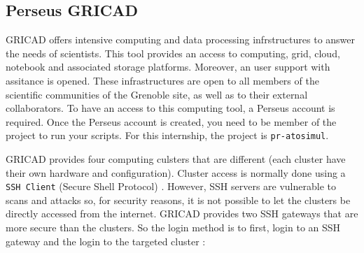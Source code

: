     \subsection{Perseus GRICAD}

        GRICAD offers intensive computing and data processing infrstructures to answer the needs of scientists. This tool provides an access to computing, grid, cloud, notebook and associated storage platforms. Moreover, an user support with assitance is opened. These infrastructures are open to all members of the scientific communities of the Grenoble site, as well as to their external collaborators. To have an access to this computing tool, a Perseus account is required. Once the Perseus account is created, you need to be member of the project to run your scripts. For this internship, the project is \verb|pr-atosimul|. \medskip

        GRICAD provides four computing culsters that are different (each cluster have their own hardware and configuration). Cluster access is normally done using a \verb|SSH Client| (Secure Shell Protocol) \cite{1}. However, SSH servers are vulnerable to scans and attacks so, for security reasons, it is not possible to let the clusters be directly accessed from the internet. GRICAD provides two SSH gateways that are more secure than the clusters. So the login method is to first, login to an SSH gateway and the login to the targeted cluster : 

        \begin{center}
            \captionsetup{type=figure}
        \end{center}
        
